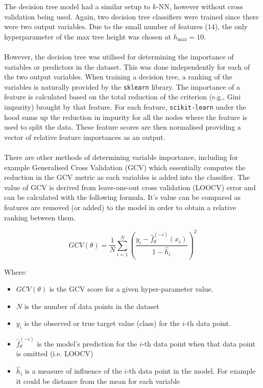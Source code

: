 \documentclass{article}
\begin{document}
The decision tree model had a similar setup to $k$-NN, however without cross validation being used. Again, two decision tree classifiers were trained since there were two output variables. Due to the small number of features ($14$), the only hyperparameter of the max tree height was chosen at $h_{\text{max}} = 10$. \\
\\
However, the decision tree was utilised for determining the importance of variables or predictors in the dataset. This was done independently for each of the two output variables. When training a decision tree, a ranking of the variables is naturally provided by the \texttt{sklearn} library. The importance of a feature is calculated based on the total reduction of the criterion (e.g., Gini impurity) brought by that feature. For each feature, \texttt{scikit-learn} under the hood sums up the reduction in impurity for all the nodes where the feature is used to split the data. These feature scores are then normalised providing a vector of relative feature importances as an output. \\
\\
There are other methods of determining variable importance, including for example Generalised Cross Validation (GCV) which essentially computes the reduction in the GCV metric as each variables is added into the classifier. The value of GCV is derived from leave-one-out cross validation (LOOCV) error and can be calculated with the following formula. It's value can be compared as features are removed (or added) to the model in order to obtain a relative ranking between them.

$$GCV(\theta) = \frac{1}{N}\sum_{i=1}^{N}\left(\frac{y_i - \hat{f}_\theta^{(-i)}(x_i)}{1-\hat{h}_i}\right)^2$$

Where:

\begin{itemize}
    \item $GCV(\theta)$ is the GCV score for a given hyper-parameter value. 
    \item $N$ is the number of data points in the dataset
    \item $y_i$ is the observed or true target value (class) for the $i$-th data point.
    \item $\hat{f}_\theta^{(-i)}$ is the model's prediction for the $i$-th data point when that data point is omitted (i.e. LOOCV)
    \item $\hat{h}_i$ is a measure of influence of the $i$-th data point in the model. For example it could be distance from the mean for each variable 
\end{itemize}
\end{document}
